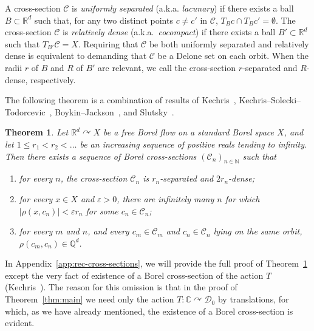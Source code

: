 \documentclass[11pt]{paper}
\newtheorem{theorem}{Theorem}
\newcommand{\bR}{\mathbb R}
\newcommand{\bC}{\mathbb C}
\newcommand{\bN}{\mathbb N}
\newcommand{\bQ}{\mathbb Q}
\newcommand{\cD}{\mathcal D}
\newcommand{\cC}{\mathcal C}
\newcommand{\eps}{\varepsilon}
\begin{document}
A cross-section $\cC$ is {\em uniformly separated}
(a.k.a. {\em lacunary}) if there exists
a ball $B\subset \bR^d$ such that, for any two distinct points $c\ne c'$ in $\cC$,
$ T_B c  \cap T_B c'= \emptyset$.
The cross-section $\cC$ is {\em relatively dense} (a.k.a.\, {\em cocompact}) if there exists a ball
$B'\subset\bR^d$ such that $T_{B'} \cC= X$.
Requiring that $\cC$ be both uniformly separated and relatively dense is
equivalent to demanding that $\cC$ be a Delone set on each orbit.
When the radii $r$ of $B$ and $R$ of $B'$ are relevant, we call the cross-section $r$-separated
and $R$-dense, respectively.

The following theorem is a combination of results of Kechris~\cite{Kechris1992, Kechris-Lectures},
Kechris--Solecki--To\-do\-rcevic~\cite{KST}, Boykin--Jackson~\cite{BJ}, and Slutsky~\cite{Slutsky2017}.


\begin{theorem}\label{thm:cross-sections}
Let  $\bR^d \curvearrowright X$ be a free Borel flow on a standard Borel space $X$, and let
$1\le r_1 < r_2 < \ldots$
be an increasing sequence of positive reals tending to infinity. Then there exists
a sequence of Borel cross-sections $(\cC_n)_{n\in\bN}$ such that
\begin{enumerate}
\item for every $n$, the cross-section $\cC_n$ is $r_n$-separated and $2r_n$-dense;
\item for every $x\in X$ and $\eps>0$, there are infinitely many $n$ for which
$|\rho (x, c_n)|< \eps r_n$ for some $c_n\in\cC_n$;
\item for every $m$ and $n$, and every $c_m\in \cC_m$ and $c_n\in\cC_n$ lying on the same orbit,
$\rho(c_m, c_n)\in\bQ^d$.
\end{enumerate}
\end{theorem}
In Appendix~\ref{app:rec-cross-sections}, we will provide the full proof of
Theorem~\ref{thm:cross-sections} except the very fact of existence of a Borel cross-section
of the action $T$ (Kechris~\cite{Kechris1992, Kechris-Lectures}). The reason for this omission is that
in the proof of Theorem~\ref{thm:main} we need only the action $T\colon\bC \curvearrowright  \cD_0$ by translations, for which, as we have already mentioned, the existence of a Borel cross-section is
evident.
\end{document}

